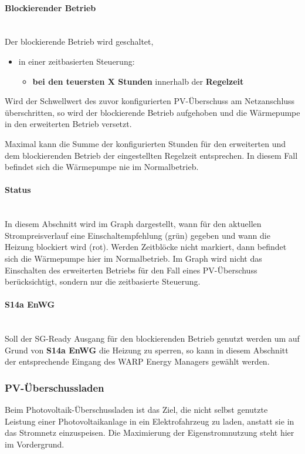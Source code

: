 \documentclass[a4paper,10pt]{article}
\newcommand{\hint}[1]{\begin{tcolorbox}[colback=boxgray,colframe=black,coltext=
white,title=Hinweis,left*=2mm,right*=2mm,boxsep=1mm,bottom=1mm,top=1mm]#1\end{tcolorbox}}
\begin{document}
\begin{multicols*}{2}
    \paragraph{Blockierender Betrieb}\ \\
    Der blockierende Betrieb wird geschaltet,
    \begin{itemize}
    \item in einer zeitbasierten Steuerung:
    \begin{itemize}
    \item \textbf{bei den teuersten X Stunden} innerhalb der \textbf{Regelzeit}
    \end{itemize}
   	\end{itemize}
    Wird der Schwellwert des zuvor konfigurierten PV-Überschuss am Netzanschluss überschritten, so wird der blockierende Betrieb aufgehoben und die Wärmepumpe in den erweiterten Betrieb versetzt.

    \hint{Maximal kann die Summe der konfigurierten Stunden für den erweiterten und dem blockierenden Betrieb der eingestellten Regelzeit entsprechen. In diesem Fall befindet sich die Wärmepumpe nie im Normalbetrieb.}

    \paragraph{Status}\ \\
    In diesem Abschnitt wird im Graph dargestellt, wann für den aktuellen Strompreisverlauf eine Einschaltempfehlung (grün) gegeben und wann die Heizung blockiert wird (rot). Werden Zeitblöcke nicht markiert, dann befindet sich
    die Wärmepumpe hier im Normalbetrieb. Im Graph wird nicht das Einschalten des erweiterten Betriebs für den Fall eines PV-Überschuss berücksichtigt, sondern nur die zeitbasierte Steuerung.

    \paragraph{S14a EnWG}\ \\
    Soll der SG-Ready Ausgang für den blockierenden Betrieb genutzt werden um auf Grund von \textbf{S14a EnWG} die Heizung zu sperren, so kann in diesem Abschnitt der entsprechende Eingang des WARP Energy Managers gewählt werden.

	\subsubsection{PV-Überschussladen}
    Beim Photovoltaik-Überschussladen ist das Ziel, die nicht selbst genutzte Leistung einer
	Photovoltaikanlage in ein
	Elektrofahrzeug zu laden, anstatt sie in das Stromnetz einzuspeisen. Die Maximierung der Eigenstromnutzung steht hier
	im Vordergrund.


\end{multicols*}
\end{document}
